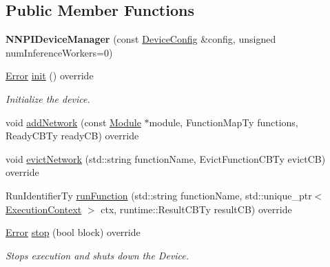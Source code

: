 \subsection*{Public Member Functions}
\begin{DoxyCompactItemize}
\item 
\mbox{\label{classglow_1_1runtime_1_1_n_n_p_i_device_manager_a2710b38ab885c780041be4894a44b87f}} 
{\bfseries N\+N\+P\+I\+Device\+Manager} (const \hyperlink{structglow_1_1runtime_1_1_device_config}{Device\+Config} \&config, unsigned num\+Inference\+Workers=0)
\item 
\mbox{\label{classglow_1_1runtime_1_1_n_n_p_i_device_manager_a4bd3185e9e69de52b3345787e1d0a6e5}} 
\hyperlink{namespaceglow_afdb176c3a672ef66db0ecfc19a8d39bf}{Error} \hyperlink{classglow_1_1runtime_1_1_n_n_p_i_device_manager_a4bd3185e9e69de52b3345787e1d0a6e5}{init} () override
\begin{DoxyCompactList}\small\item\em Initialize the device. \end{DoxyCompactList}\item 
void \hyperlink{classglow_1_1runtime_1_1_n_n_p_i_device_manager_a4fcbaacf52744393b047392777c9ae14}{add\+Network} (const \hyperlink{classglow_1_1_module}{Module} $\ast$module, Function\+Map\+Ty functions, Ready\+C\+B\+Ty ready\+CB) override
\item 
void \hyperlink{classglow_1_1runtime_1_1_n_n_p_i_device_manager_ae8afcfbbd9badbdd13dacc08d813ec2d}{evict\+Network} (std\+::string function\+Name, Evict\+Function\+C\+B\+Ty evict\+CB) override
\item 
Run\+Identifier\+Ty \hyperlink{classglow_1_1runtime_1_1_n_n_p_i_device_manager_a86f8010d5b5c6f235144d930f8392d3a}{run\+Function} (std\+::string function\+Name, std\+::unique\+\_\+ptr$<$ \hyperlink{classglow_1_1_execution_context}{Execution\+Context} $>$ ctx, runtime\+::\+Result\+C\+B\+Ty result\+CB) override
\item 
\mbox{\label{classglow_1_1runtime_1_1_n_n_p_i_device_manager_ab8e55a2e3a4f6edc05989ff2e9fcbb38}} 
\hyperlink{namespaceglow_afdb176c3a672ef66db0ecfc19a8d39bf}{Error} \hyperlink{classglow_1_1runtime_1_1_n_n_p_i_device_manager_ab8e55a2e3a4f6edc05989ff2e9fcbb38}{stop} (bool block) override
\begin{DoxyCompactList}\small\item\em Stops execution and shuts down the Device. \end{DoxyCompactList}\item 

\end{DoxyCompactItemize}

